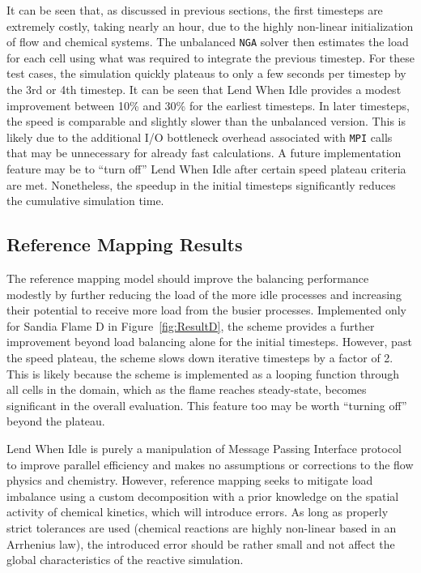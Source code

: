 \documentclass[letterpaper,twocolumn,10pt]{article}
\begin{document}
It can be seen that, as discussed in previous sections, the first timesteps are extremely costly, taking nearly an hour, due to the highly non-linear initialization of flow and chemical systems. The unbalanced \texttt{NGA} solver then estimates the load for each cell using what was required to integrate the previous timestep. For these test cases, the simulation quickly plateaus to only a few seconds per timestep by the 3rd or 4th timestep. It can be seen that Lend When Idle provides a modest improvement between 10\% and 30\% for the earliest timesteps. In later timesteps, the speed is comparable and slightly slower than the unbalanced version. This is likely due to the additional I/O bottleneck overhead associated with \texttt{MPI} calls that may be unnecessary for already fast calculations. A future implementation feature may be to ``turn off'' Lend When Idle after certain speed plateau criteria are met. Nonetheless, the speedup in the initial timesteps significantly reduces the cumulative simulation time.

\subsection{Reference Mapping Results}
The reference mapping model should improve the balancing performance modestly by further reducing the load of the more idle processes and increasing their potential to receive more load from the busier processes. Implemented only for Sandia Flame D in Figure~\ref{fig:ResultD}, the scheme provides a further improvement beyond load balancing alone for the initial timesteps. However, past the speed plateau, the scheme slows down iterative timesteps by a factor of 2. This is likely because the scheme is implemented as a looping function through all cells in the domain, which as the flame reaches steady-state, becomes significant in the overall evaluation. This feature too may be worth ``turning off'' beyond the plateau. 

Lend When Idle is purely a manipulation of Message Passing Interface protocol to improve parallel efficiency and makes no assumptions or corrections to the flow physics and chemistry. However, reference mapping seeks to mitigate load imbalance using a custom decomposition with a prior knowledge on the spatial activity of chemical kinetics, which will introduce errors. As long as properly strict tolerances are used (chemical reactions are highly non-linear based in an Arrhenius law), the introduced error should be rather small and not affect the global characteristics of the reactive simulation. 
\end{document}
